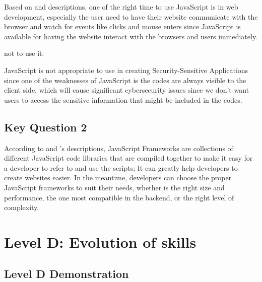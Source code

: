 \documentclass[a4paper, 11pt]{report}
\begin{document}
Based on \cite{coyier-2009} and \cite{pedamkar-2023} descriptions, one of the right time to use JavaScript is in web development, especially the user need to have their website communicate with the browser and watch for events like clicks and mouse enters since JavaScript is available for having the website interact with the browsers and users immediately.

not to use it:

JavaScript is not appropriate to use in creating Security-Sensitive Applications since one of the weaknesses of JavaScript is the codes are always visible to the client side, which will cause significant cybersecurity issues since we don't want users to access the sensitive information that might be included in the codes.


\subsection{Key Question 2}
According to \cite{brewster-no-date} and \cite{codemotion-2023}'s descriptions, JavaScript Frameworks are collections of different JavaScript code libraries that are compiled together to make it easy for a developer to refer to and use the scripts; It can greatly help developers to create websites easier. In the meantime, developers can choose the proper JavaScript frameworks to suit their needs, whether is the right size and performance, the one most compatible in the backend, or the right level of complexity.


\newpage
\section{Level D: Evolution of skills}
\vspace{5mm}
\subsection{Level D Demonstration}

\end{document}
